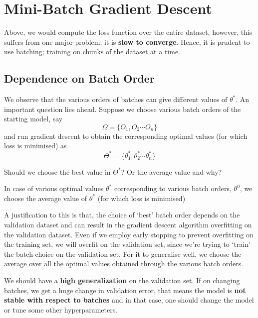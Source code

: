 \documentclass[12pt]{article}
\begin{document}
\section{Mini-Batch Gradient Descent}
Above, we would compute the loss function over the entire dataset, however, this suffers from one major problem; it is \textbf{slow to converge}\cite{rate}. Hence, it is prudent to use batching; training on chunks of the dataset at a time.

\subsection{Dependence on Batch Order}
We observe that the various orders of batches can give different values of $\theta^\ast$. An important question lies ahead. Suppose we choose various batch orders of the starting model, say \[\Omega = \{O_1, O_2 \cdots O_n\}\] and run gradient descent to obtain the corresponding optimal values (for which loss is minimised) as \[\Theta^\ast = \{\theta^\ast_1,\theta^\ast_2 \cdots \theta^\ast_n\}\]

Should we choose the best value in $\Theta^\ast$? Or the average value and why?

\begin{claim}
In case of various optimal values $\theta^\ast$ corresponding to various batch orders, $\theta^0$, we choose the average value of $\theta^\ast$ (for which loss is minimised)
\end{claim}

A justification to this is that, the choice of `best' batch order depends on the validation dataset and can result in the gradient descent algorithm overfitting on the validation dataset. Even if we employ early stopping to prevent overfitting on the training set, we will overfit on the validation set, since we're trying to `train' the batch choice on the validation set. For it to generalise well, we choose the average over all the optimal values obtained through the various batch orders.

We should have a \textbf{high generalization} on the validation set. If on changing batches, we get a huge change in validation error, that means the model is \textbf{not stable with respect to batches} and in that case, one should change the model or tune some other hyperparameters. 
\end{document}

